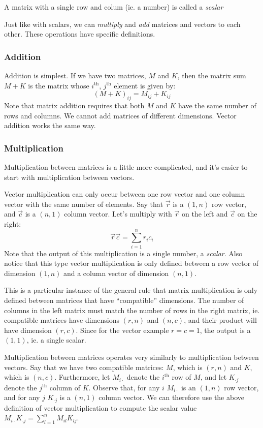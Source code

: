 \documentclass[
]{article}
\begin{document}
A matrix with a single row and colum (ie. a number) is called a
\emph{scalar}

Just like with scalars, we can \emph{multiply} and \emph{add} matrices
and vectors to each other. These operations have specific definitions.

\hypertarget{addition}{%
\subsubsection{Addition}\label{addition}}

Addition is simplest. If we have two matrices, \(M\) and \(K\), then the
matrix sum \(M+K\) is the matrix whose \(i^{\text{th}}\),
\(j^{\text{th}}\) element is given by: \[
(M+K)_{ij} = M_{ij} + K_{ij}
\] Note that matrix addition requires that both \(M\) and \(K\) have the
same number of rows and columns. We cannot add matrices of different
dimensions. Vector addition works the same way.

\hypertarget{multiplication}{%
\subsubsection{Multiplication}\label{multiplication}}

Multiplication between matrices is a little more complicated, and it's
easier to start with multiplication between vectors.

Vector multiplication can only occur between one row vector and one
column vector with the same number of elements. Say that \(\vec{r}\) is
a \((1,n)\) row vector, and \(\vec{c}\) is a \((n,1)\) column vector.
Let's multiply with \(\vec{r}\) on the left and \(\vec{c}\) on the
right: \[
\vec{r} \vec{c} = \sum\limits_{i=1}^n r_i c_i
\] Note that the output of this multiplication is a single number, a
\emph{scalar}. Also notice that this type vector multiplication is only
defined between a row vector of dimension \((1,n)\) and a column vector
of dimension \((n,1)\).

This is a particular instance of the general rule that matrix
multiplication is only defined between matrices that have ``compatible''
dimensions. The number of columns in the left matrix must match the
number of rows in the right matrix, ie. compatible matrices have
dimensions \((r,n)\) and \((n,c)\), and their product will have
dimension \((r,c)\). Since for the vector example \(r=c=1\), the output
is a \((1,1)\), ie. a single scalar.

Multiplication between matrices operates very similarly to
multiplication between vectors. Say that we have two compatible
matrices: \(M\), which is \((r,n)\) and \(K\), which is \((n,c)\).
Furthermore, let \(M_{i\cdot}\) denote the \(i^{\text{th}}\) row of
\(M\), and let \(K_{\cdot j}\) denote the \(j^{\text{th}}\) column of
\(K\). Observe that, for any \(i\) \(M_{i\cdot}\) is an \((1,n)\) row
vector, and for any \(j\) \(K_{\cdot j}\) is a \((n,1)\) column vector.
We can therefore use the above definition of vector multiplication to
compute the scalar value
\(M_{i\cdot} K_{\cdot j} = \sum\limits_{l=1}^n M_{il}K_{lj}\).
\end{document}
